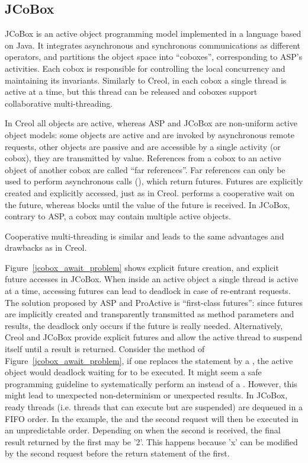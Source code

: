 \subsection{JCoBox}
JCoBox \cite{schafer2010jcobox} is an active object programming model
implemented in a language based on Java.  It integrates asynchronous
and synchronous communications as different operators, and partitions the
object space into ``coboxes'', corresponding to ASP's
activities. Each cobox is responsible for controlling the local
concurrency and maintaining its invariants. 
Similarly to Creol, in each cobox a single thread is active at a time, but this thread can be released and coboxes
support collaborative multi-threading.


In Creol \cite{Johnsen2006a} all objects are active, whereas ASP
and JCoBox are non-uniform active object models: some objects are active and are invoked by asynchronous
remote requests, other objects are passive and are accessible by a
single activity (or cobox), they are transmitted by value.  References
from a cobox to an active object of another cobox are called ``far
references''. Far references can only be used to perform asynchronous
calls (), which return futures.  Futures are
explicitly created and explicitly accessed, just as in Creol.
 performs a cooperative wait on the future, whereas
 blocks until the value of the future is received.  In
JCoBox, contrary to ASP, a cobox may contain multiple active objects.

Cooperative multi-threading is similar and leads to the same
advantages and drawbacks as  in Creol. 


Figure~\ref{jcobox_await_problem} shows explicit future creation, and
explicit future accesses in JCoBox.
When inside an active object a single thread is active at a time, accessing futures can lead to deadlock in case of re-entrant
requests. The solution proposed by ASP and ProActive is ``first-class
futures'': since futures are implicitly created and transparently
transmitted as method parameters and results, the deadlock only occurs
if the future is really needed.  Alternatively, Creol and JCoBox
provide explicit futures and allow the active thread to suspend itself
until a result is returned. Consider the method  of
Figure~\ref{jcobox_await_problem}, if one replaces the
 statement by a , the active object would deadlock waiting for
 to be executed. It might seem a safe programming guideline
to systematically perform an  instead of a .
However, this might lead to unexpected non-determinism or unexpected
results. In JCoBox, ready threads (i.e. threads that can execute but
are suspended) are dequeued in a FIFO order. In the
example, the  and the second  request will then be executed
in an unpredictable order. Depending on when the second
 is received, the final result returned by the first
 may be '2'. This happens because 'x' can be modified by
the second  request before the return statement of the
first.

